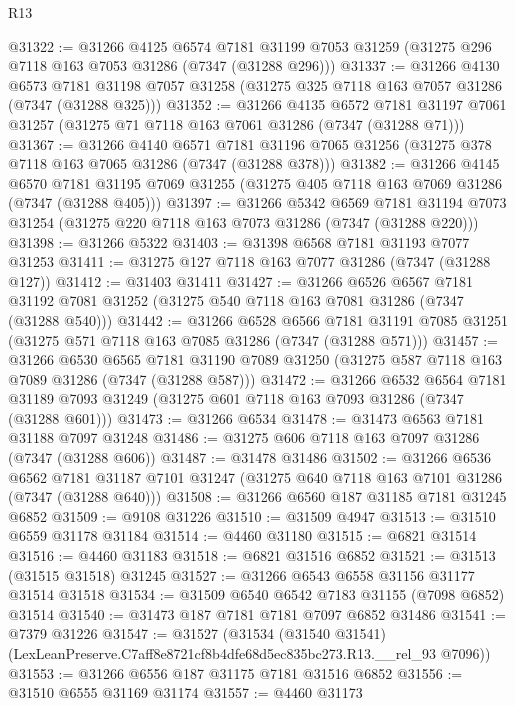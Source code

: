 \begin{lexlean}{R13}
\begin{coremodule}
@31322 := @31266
    @4125
    @6574
    @7181
    @31199
    @7053
    @31259
    (@31275 @296 @7118 @163 @7053 @31286 (@7347 (@31288 @296)))
@31337 := @31266
    @4130
    @6573
    @7181
    @31198
    @7057
    @31258
    (@31275 @325 @7118 @163 @7057 @31286 (@7347 (@31288 @325)))
@31352 := @31266
    @4135
    @6572
    @7181
    @31197
    @7061
    @31257
    (@31275 @71 @7118 @163 @7061 @31286 (@7347 (@31288 @71)))
@31367 := @31266
    @4140
    @6571
    @7181
    @31196
    @7065
    @31256
    (@31275 @378 @7118 @163 @7065 @31286 (@7347 (@31288 @378)))
@31382 := @31266
    @4145
    @6570
    @7181
    @31195
    @7069
    @31255
    (@31275 @405 @7118 @163 @7069 @31286 (@7347 (@31288 @405)))
@31397 := @31266
    @5342
    @6569
    @7181
    @31194
    @7073
    @31254
    (@31275 @220 @7118 @163 @7073 @31286 (@7347 (@31288 @220)))
@31398 := @31266 @5322
@31403 := @31398 @6568 @7181 @31193 @7077 @31253
@31411 := @31275 @127 @7118 @163 @7077 @31286 (@7347 (@31288 @127))
@31412 := @31403 @31411
@31427 := @31266
    @6526
    @6567
    @7181
    @31192
    @7081
    @31252
    (@31275 @540 @7118 @163 @7081 @31286 (@7347 (@31288 @540)))
@31442 := @31266
    @6528
    @6566
    @7181
    @31191
    @7085
    @31251
    (@31275 @571 @7118 @163 @7085 @31286 (@7347 (@31288 @571)))
@31457 := @31266
    @6530
    @6565
    @7181
    @31190
    @7089
    @31250
    (@31275 @587 @7118 @163 @7089 @31286 (@7347 (@31288 @587)))
@31472 := @31266
    @6532
    @6564
    @7181
    @31189
    @7093
    @31249
    (@31275 @601 @7118 @163 @7093 @31286 (@7347 (@31288 @601)))
@31473 := @31266 @6534
@31478 := @31473 @6563 @7181 @31188 @7097 @31248
@31486 := @31275 @606 @7118 @163 @7097 @31286 (@7347 (@31288 @606))
@31487 := @31478 @31486
@31502 := @31266
    @6536
    @6562
    @7181
    @31187
    @7101
    @31247
    (@31275 @640 @7118 @163 @7101 @31286 (@7347 (@31288 @640)))
@31508 := @31266 @6560 @187 @31185 @7181 @31245 @6852
@31509 := @9108 @31226
@31510 := @31509 @4947
@31513 := @31510 @6559 @31178 @31184
@31514 := @4460 @31180
@31515 := @6821 @31514
@31516 := @4460 @31183
@31518 := @6821 @31516 @6852
@31521 := @31513 (@31515 @31518) @31245
@31527 := @31266 @6543 @6558 @31156 @31177 @31514 @31518
@31534 := @31509 @6540 @6542 @7183 @31155 (@7098 @6852) @31514
@31540 := @31473 @187 @7181 @7181 @7097 @6852 @31486
@31541 := @7379 @31226
@31547 := @31527
    (@31534 (@31540 @31541) (LexLeanPreserve.C7aff8e8721cf8b4dfe68d5ec835bc273.R13.__rel_93 @7096))
@31553 := @31266 @6556 @187 @31175 @7181 @31516 @6852
@31556 := @31510 @6555 @31169 @31174
@31557 := @4460 @31173

\end{coremodule}
\end{lexlean}
